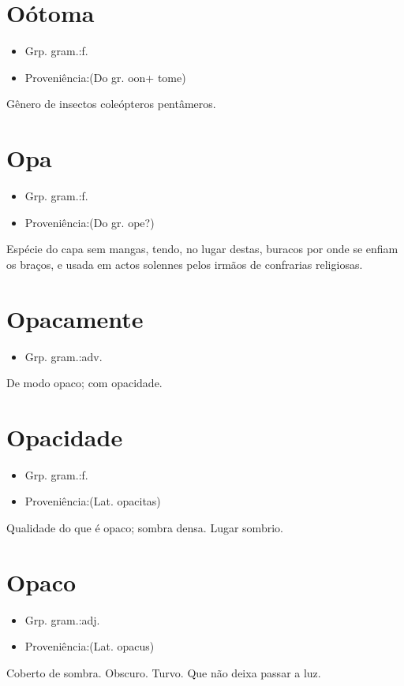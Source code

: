 \section{Oótoma}
\begin{itemize}
\item {Grp. gram.:f.}
\end{itemize}
\begin{itemize}
\item {Proveniência:(Do gr. \textunderscore oon\textunderscore  + \textunderscore tome\textunderscore )}
\end{itemize}
Gênero de insectos coleópteros pentâmeros.
\section{Opa}
\begin{itemize}
\item {Grp. gram.:f.}
\end{itemize}
\begin{itemize}
\item {Proveniência:(Do gr. \textunderscore ope\textunderscore ?)}
\end{itemize}
Espécie do capa sem mangas, tendo, no lugar destas, buracos por onde se enfiam os braços, e usada em actos solennes pelos irmãos de confrarias religiosas.
\section{Opacamente}
\begin{itemize}
\item {Grp. gram.:adv.}
\end{itemize}
De modo opaco; com opacidade.
\section{Opacidade}
\begin{itemize}
\item {Grp. gram.:f.}
\end{itemize}
\begin{itemize}
\item {Proveniência:(Lat. \textunderscore opacitas\textunderscore )}
\end{itemize}
Qualidade do que é opaco; sombra densa.
Lugar sombrio.
\section{Opaco}
\begin{itemize}
\item {Grp. gram.:adj.}
\end{itemize}
\begin{itemize}
\item {Proveniência:(Lat. \textunderscore opacus\textunderscore )}
\end{itemize}
Coberto de sombra.
Obscuro.
Turvo.
Que não deixa passar a luz.
